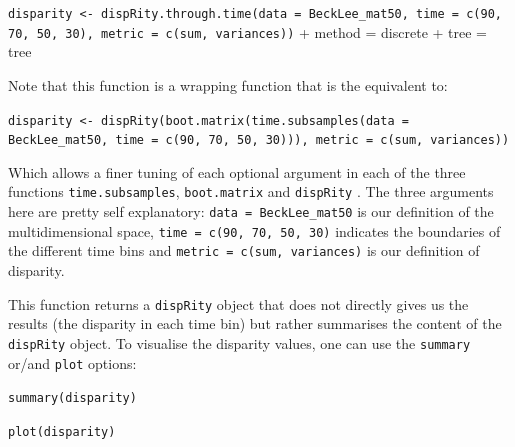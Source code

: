 \documentclass[12pt,letterpaper]{article}
\newcommand{\disp}{\texttt{dispRity} }
\begin{document}
\texttt{disparity <- dispRity.through.time(data = BeckLee\_mat50, time = c(90, 70, 50, 30), metric = c(sum, variances))}
+ method = discrete
+ tree = tree

\noindent Note that this function is a wrapping function that is the equivalent to:

\texttt{disparity <- dispRity(boot.matrix(time.subsamples(data = BeckLee\_mat50, time = c(90, 70, 50, 30))), metric = c(sum, variances))}

\noindent Which allows a finer tuning of each optional argument in each of the three functions \texttt{time.subsamples}, \texttt{boot.matrix} and \disp.
The three arguments here are pretty self explanatory: \texttt{data = BeckLee\_mat50} is our definition of the multidimensional space, \texttt{time = c(90, 70, 50, 30)} indicates the boundaries of the different time bins and \texttt{metric = c(sum, variances)} is our definition of disparity.

This function returns a \disp object that does not directly gives us the results (the disparity in each time bin) but rather summarises the content of the \disp object.
To visualise the disparity values, one can use the \texttt{summary} or/and \texttt{plot} options:

\texttt{summary(disparity)}

\texttt{plot(disparity)}


  


\end{document}
